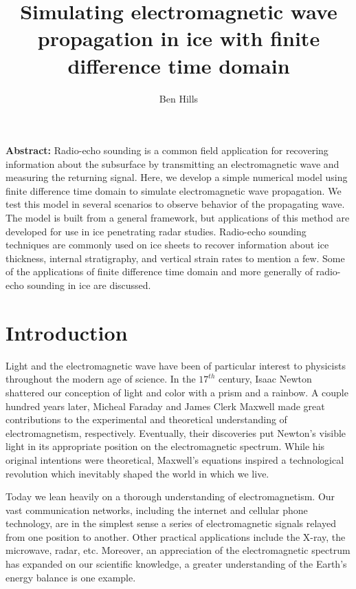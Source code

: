\documentclass[a4paper]{article}
\begin{document}
\title{Simulating electromagnetic wave propagation in ice with finite difference time domain}
\author{Ben Hills}
\maketitle

\justify
\textbf{Abstract:} Radio-echo sounding is a common field application for recovering information about the subsurface by transmitting an electromagnetic wave and measuring the returning signal. 
Here, we develop a simple numerical model using finite difference time domain to simulate electromagnetic wave propagation. We test this model in several scenarios to observe behavior of the propagating wave. The model is built from a general framework, but applications of this method are developed for use
in ice penetrating radar studies. Radio-echo sounding techniques are commonly used on ice sheets to recover information about ice thickness, internal stratigraphy, and vertical strain rates to mention a few. Some of the applications of finite difference time domain and more generally of radio-echo sounding in ice are discussed. 

\raggedright
\section{Introduction}

Light and the electromagnetic wave have been of particular interest to physicists throughout the modern age of science. In the $17^{th}$ century, Isaac Newton shattered our conception of light and color with a prism and a rainbow. A couple hundred years later, Micheal Faraday and James Clerk Maxwell made great contributions to the experimental and theoretical understanding of electromagnetism, respectively. Eventually, their discoveries put Newton's visible light in its appropriate position on
the electromagnetic spectrum. While his original intentions were theoretical, Maxwell's equations inspired a technological revolution which inevitably shaped the world in which we live.

Today we lean heavily on a thorough understanding of electromagnetism. Our vast communication networks, including the internet and cellular phone technology, are in the simplest sense a series of electromagnetic signals relayed from one position to another. Other practical applications include the X-ray, the microwave, radar, etc. Moreover, an appreciation of the electromagnetic spectrum has expanded on our scientific knowledge, a greater understanding of the Earth's energy balance is one example.
\end{document}
